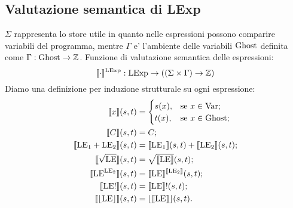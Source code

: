 \subsection{Valutazione semantica di LExp}
$\Sigma$ rappresenta lo store utile in quanto nelle espressioni possono comparire variabili del programma, mentre $\Gamma$ e' l'ambiente delle variabili $\mathrm{Ghost}$ definita come $\Gamma\mathrel{:}\mathrm{Ghost}\rightarrow\mathbb{Z}$. Funzione di valutazione semantica delle espressioni:
\[
\llbracket\cdot\rrbracket ^{\mathrm{LExp}}: \mathrm{LExp} \rightarrow ((\Sigma \times \Gamma) \rightarrow \mathbb{Z})
\]
Diamo una definizione per induzione strutturale su ogni espressione:
\begin{align*}
   \llbracket x \rrbracket(s,t)
      &=
        \begin{cases}
                 s(x), &\text{se $x \in\mathrm{Var}$};\\
                 t(x), &\text{se $ x \in\mathrm{Ghost}$};
        \end{cases}\\
   \llbracket  C\rrbracket(s,t)
     &=  C;\\
   \llbracket \mathrm{LE}_1+\mathrm{LE}_2 \rrbracket(s,t)
     &= \llbracket \mathrm{LE}_1 \rrbracket(s,t) + \llbracket \mathrm{LE}_2\rrbracket( s, t);\\
   \llbracket \sqrt{\mathrm{LE}} \rrbracket(s,t)
     &= \sqrt{\llbracket\mathrm{LE}\rrbracket}(s,t);\\
   \llbracket \mathrm{LE}^{\mathrm{LE}_2}\rrbracket(s,t)
     &= \llbracket\mathrm{LE}\rrbracket^{\llbracket\mathrm{LE}_2\rrbracket}(s,t);\\
   \llbracket \mathrm{LE}!\rrbracket(s,t)
     &= \llbracket\mathrm{LE}\rrbracket!(s,t);\\
   \llbracket \lfloor \mathrm{LE} \rfloor\rrbracket(s,t)
     &= \lfloor\llbracket \mathrm{LE} \rrbracket\rfloor(s,t).
\end{align*}
